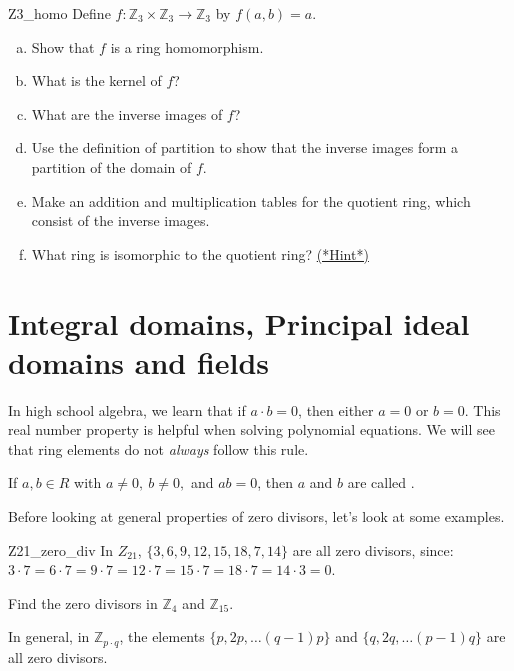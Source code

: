 \begin{exercise}{Z3_homo}
Define $f:{\mathbb Z}_3\times {\mathbb Z}_3\rightarrow {\mathbb Z}_3$ by $f(a,b)=a$.
\begin{enumerate}[(a)]
\item Show that $f$ is a ring homomorphism.
\item What is the kernel of $f$?
\item What are the inverse images of $f$?
\item Use the definition of partition to show that the inverse images form a partition of the domain of $f$.
\item Make an addition and multiplication tables for the quotient ring, which consist of the inverse images.
\item What ring is isomorphic to the quotient ring?  \hyperref[ringsHints]{(*Hint*)} 
\end{enumerate}
\end{exercise}


\section{Integral domains, Principal ideal domains and fields}
\label{sec:Rings:IntegralDomainsPrincipalIdealDomains}

In high school algebra, we learn that if $a\cdot b=0$, then either $a=0$ or $b=0$.  This real number property is helpful when solving polynomial equations.  We will see that ring elements do not \emph{always} follow this rule.

\begin{defn}\label{zero_divisor}
If $a,b\in R$ with $a\neq 0,~b\neq 0,$ and $ab=0$, then $a$ and $b$ are called .
\end{defn}

Before looking at general properties of zero divisors, let's look at some examples.

\begin{example}{Z21_zero_div}
In $Z_{21}$, $\{3,6,9,12,15,18,7,14\}$ are all zero divisors, since:
$3\cdot 7=6\cdot 7=9\cdot 7=12\cdot 7=15\cdot 7=18\cdot 7=14\cdot 3=0$.
\end{example}

\begin{exercise}{}
Find the zero divisors in ${\mathbb Z}_4$ and ${\mathbb Z}_{15}$.
\end{exercise}

In general, in ${\mathbb Z}_{p\cdot q}$, the elements $\{p,2p,\dots(q-1)p\}$ and $\{q,2q,\dots (p-1)q\}$ are all zero divisors.  

